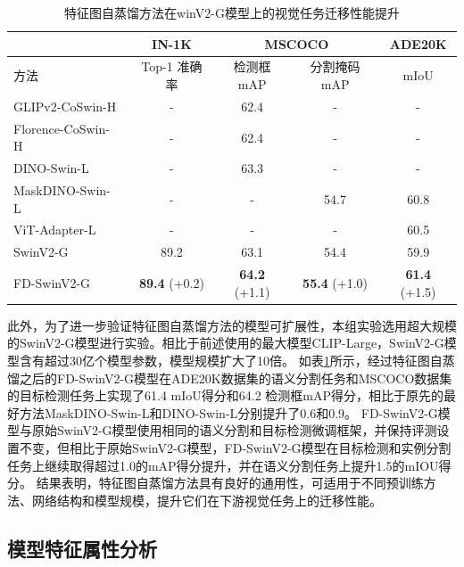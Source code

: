 \begin{table}
\caption{
特征图自蒸馏方法在winV2-G模型上的视觉任务迁移性能提升}
\centering
  \begin{tabular}{lcccc}
  
\toprule

   &  IN-1K & \multicolumn{2}{c}{MSCOCO}  & ADE20K  \\
  \midrule
  方法 &Top-1 准确率 & 检测框mAP & 分割掩码mAP & mIoU \\
  \midrule
  GLIPv2-CoSwin-H~\cite{GLIPv2_2022} & - & 62.4 & - & - \\
  Florence-CoSwin-H~\cite{yuan2021florence} & - & 62.4 & - & -  \\
  DINO-Swin-L~\cite{zhang2022dino} & - & 63.3 & - & - \\
  MaskDINO-Swin-L~\cite{li2022mask} & - & - & 54.7 & 60.8 \\
  ViT-Adapter-L~\cite{chen2022vitadapter} & - & - & - & 60.5 \\
    
\midrule
  SwinV2-G & 89.2 & 63.1 & 54.4 & 59.9 \\
  FD-SwinV2-G & \textbf{89.4}\scriptsize{ (+0.2)} & \textbf{64.2}\scriptsize{ (+1.1)} & \textbf{55.4}\scriptsize{ (+1.0)} & \textbf{61.4}\scriptsize{ (+1.5)} \\
%      
  
\bottomrule
  \end{tabular}
\label{tab:fd-swinv2_G}
\end{table}

此外，为了进一步验证特征图自蒸馏方法的模型可扩展性，本组实验选用超大规模的SwinV2-G\cite{swinv2cvpr}模型进行实验。相比于前述使用的最大模型CLIP-Large，SwinV2-G模型含有超过30亿个模型参数，模型规模扩大了10倍。
如表\ref{tab:fd-swinv2_G}所示，经过特征图自蒸馏之后的FD-SwinV2-G模型在ADE20K数据集的语义分割任务和MSCOCO数据集的目标检测任务上实现了61.4 mIoU得分和64.2 检测框mAP得分，相比于原先的最好方法MaskDINO-Swin-L和DINO-Swin-L\cite{zhang2022dino,li2022mask}分别提升了0.6和0.9。
FD-SwinV2-G模型与原始SwinV2-G模型使用相同的语义分割和目标检测微调框架\cite{xiao2018upernet, chen2019htc}，并保持评测设置不变，但相比于原始SwinV2-G模型，FD-SwinV2-G模型在目标检测和实例分割任务上继续取得超过1.0的mAP得分提升，并在语义分割任务上提升1.5的mIOU得分。
结果表明，特征图自蒸馏方法具有良好的通用性，可适用于不同预训练方法、网络结构和模型规模，提升它们在下游视觉任务上的迁移性能。


\subsection{模型特征属性分析}
\label{sec:fd-analysis}

